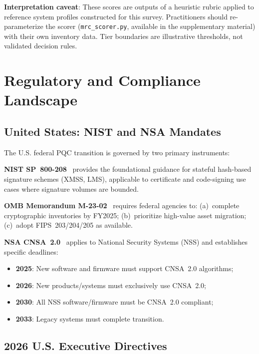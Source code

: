 \documentclass[journal]{IEEEtran}
\begin{document}
\textbf{Interpretation caveat}: These scores are outputs of a heuristic rubric
applied to reference system profiles constructed for this survey. Practitioners
should re-parameterize the scorer (\texttt{mrc\_scorer.py}, available in the
supplementary material) with their own inventory data. Tier boundaries are
illustrative thresholds, not validated decision rules.

\section{Regulatory and Compliance Landscape}
\label{sec:regulatory}

\subsection{United States: NIST and NSA Mandates}

The U.S. federal PQC transition is governed by two primary instruments:

\textbf{NIST SP~800-208}~\cite{cooper2020migration} provides the foundational guidance
for stateful hash-based signature schemes (XMSS, LMS), applicable to
certificate and code-signing use cases where signature volumes are bounded.

\textbf{OMB Memorandum M-23-02}~\cite{omb2023m2302} requires federal agencies
to: (a)~complete cryptographic inventories by FY2025; (b)~prioritize high-value
asset migration; (c)~adopt FIPS~203/204/205 as available.

\textbf{NSA CNSA~2.0}~\cite{nsacnsa2022} applies to National Security Systems
(NSS) and establishes specific deadlines:
\begin{itemize}
  \item \textbf{2025}: New software and firmware must support CNSA~2.0 algorithms;
  \item \textbf{2026}: New products/systems must exclusively use CNSA~2.0;
  \item \textbf{2030}: All NSS software/firmware must be CNSA~2.0 compliant;
  \item \textbf{2033}: Legacy systems must complete transition.
\end{itemize}

\subsection{2026 U.S. Executive Directives}
\end{document}
